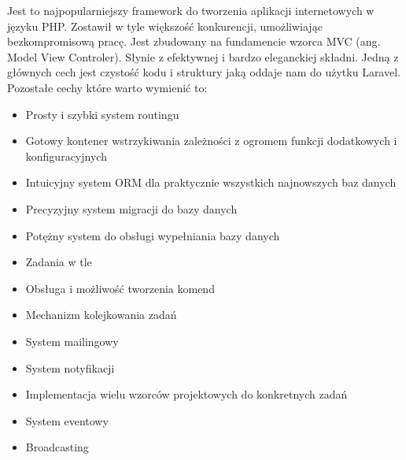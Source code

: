 Jest to najpopularniejszy framework do tworzenia aplikacji internetowych w języku PHP. Zostawił w tyle większość konkurencji, umożliwiając bezkompromisową pracę.  
Jest zbudowany na fundamencie wzorca MVC (ang. Model View Controler).  
Słynie z efektywnej i bardzo eleganckiej składni. Jedną z głównych cech jest czystość kodu i struktury jaką oddaje nam do użytku Laravel.
Pozostałe cechy które warto wymienić to: 

\begin{itemize}
    \item Prosty i szybki system routingu 
    \item Gotowy kontener wstrzykiwania zależności z ogromem funkcji dodatkowych i konfiguracyjnych 
    \item Intuicyjny system ORM dla praktycznie wszystkich najnowszych baz danych 
    \item Precyzyjny system migracji do bazy danych 
    \item Potężny system do obsługi wypełniania bazy danych  
    \item Zadania w tle  
    \item Obsługa i możliwość tworzenia komend 
    \item Mechanizm kolejkowania zadań 
    \item System mailingowy  
    \item System notyfikacji   
    \item Implementacja wielu wzorców projektowych do konkretnych zadań 
    \item System eventowy 
    \item Broadcasting
  \end{itemize}